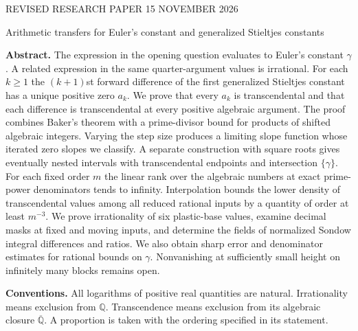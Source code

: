 \documentclass[11pt,a4paper]{article}
\theoremstyle{definition}\newtheorem{definition}[theorem]{Definition}\newtheorem{example}[theorem]{Example}
\theoremstyle{remark}\newtheorem{remark}[theorem]{Remark}
\begin{document}
\thispagestyle{empty}
{\sffamily\color{teal} REVISED RESEARCH PAPER \hfill 15 NOVEMBER 2026}\par\vspace{1.5em}
{\sffamily\bfseries\color{ink}\fontsize{24}{28}\selectfont\raggedright Arithmetic transfers for Euler's constant and generalized Stieltjes constants\par}
\vspace{.65em}{\large Finite-difference zeros, limiting slopes and arithmetic tests for Euler's constant\par}
\vspace{.9em}{\sffamily Keio and Shaitetsu research notes}\par\vspace{1.15em}
\noindent\textbf{Abstract.}
The expression in the opening question evaluates to Euler's constant $\gamma$. A related expression in the same quarter-argument values is irrational. For each $k\ge1$ the $(k+1)$st forward difference of the first generalized Stieltjes constant has a unique positive zero $a_k$. We prove that every $a_k$ is transcendental and that each difference is transcendental at every positive algebraic argument. The proof combines Baker's theorem with a prime-divisor bound for products of shifted algebraic integers. Varying the step size produces a limiting slope function whose iterated zero slopes we classify. A separate construction with square roots gives eventually nested intervals with transcendental endpoints and intersection $\{\gamma\}$. For each fixed order $m$ the linear rank over the algebraic numbers at exact prime-power denominators tends to infinity. Interpolation bounds the lower density of transcendental values among all reduced rational inputs by a quantity of order at least $m^{-3}$. We prove irrationality of six plastic-base values, examine decimal masks at fixed and moving inputs, and determine the fields of normalized Sondow integral differences and ratios. We also obtain sharp error and denominator estimates for rational bounds on $\gamma$. Nonvanishing at sufficiently small height on infinitely many blocks remains open.
\par\medskip\noindent\textbf{Conventions.} All logarithms of positive real quantities are natural. Irrationality means exclusion from $\mathbb Q$. Transcendence means exclusion from its algebraic closure $\overline{\mathbb Q}$. A proportion is taken with the ordering specified in its statement.
\vspace{.5em}
\par\medskip
\ifXeTeX
\end{document}
